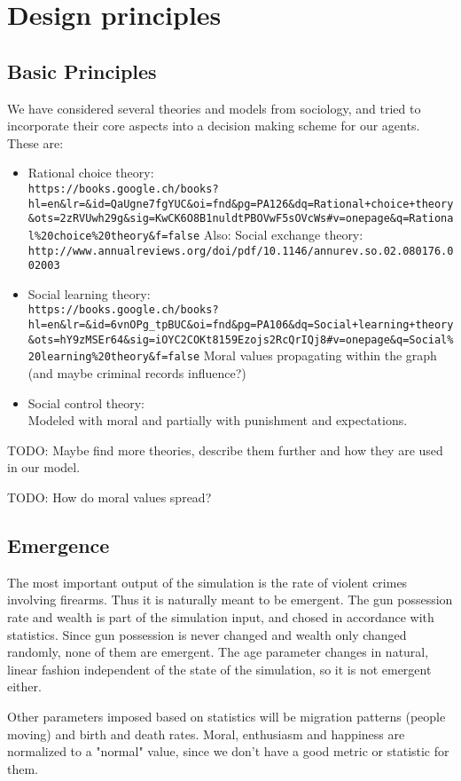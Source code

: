\documentclass{article}
\begin{document}
	\section{Design principles}
		\subsection{Basic Principles}
			We have considered several theories and models from sociology, and tried to incorporate
			their core aspects into a decision making scheme for our agents. These are:
			\begin{itemize}
				\item Rational choice theory:\\
					\verb|https://books.google.ch/books?hl=en&lr=&id=QaUgne7fgYUC&oi=fnd&pg=PA126&dq=Rational+choice+theory&ots=2zRVUwh29g&sig=KwCK6O8B1nuldtPBOVwF5sOVcWs#v=onepage&q=Rational%20choice%20theory&f=false|
					Also: Social exchange theory:\\
					\verb|http://www.annualreviews.org/doi/pdf/10.1146/annurev.so.02.080176.002003|

				\item Social learning theory:\\
					\verb|https://books.google.ch/books?hl=en&lr=&id=6vnOPg_tpBUC&oi=fnd&pg=PA106&dq=Social+learning+theory&ots=hY9zMSEr64&sig=iOYC2COKt8159Ezojs2RcQrIQj8#v=onepage&q=Social%20learning%20theory&f=false|
					Moral values propagating within the graph (and maybe criminal records
					influence?)

				\item Social control theory:\\
					Modeled with moral and partially with punishment and expectations.
			\end{itemize}
			\par
			TODO: Maybe find more theories, describe them further and how they are used in our model.
			\par
			TODO: How do moral values spread?

		\subsection{Emergence}
			The most important output of the simulation is the rate of violent crimes involving
			firearms. Thus it is naturally meant to be emergent. The gun possession rate and
			wealth is part
			of the simulation input, and chosed in accordance with statistics. Since gun
			possession is never changed and wealth only changed randomly, none of them are
			emergent.
			The age parameter changes in natural, linear fashion independent of the state of the
			simulation, so it is not emergent either.
			\par
			Other parameters imposed based on statistics will be migration patterns (people
			moving) and birth and death
			rates. Moral, enthusiasm and happiness are normalized to a "normal" value, since
			we don't have a good metric or statistic for them.
\end{document}
